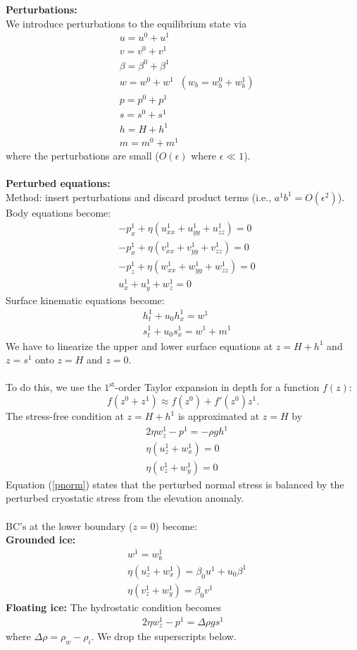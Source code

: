 \documentclass[paper=a4, fontsize=11pt]{article}
\begin{document}
\noindent\textbf{Perturbations:}\\
We introduce perturbations to the equilibrium state via
\begin{align}
&u= u^0 +  u^1 \\
&v= v^0 +  v^1 \\
&\beta = \beta^0 + \beta^1 \\
&w =  w^0 + w^1 \;\; (w_b=w_b^0 + w_b^1)\\
&p = p^0 +  p^1\\
&s =  s^0 + s^1 \\
&h = H +  h^1 \\
&m = m^0 + m^1
\end{align}
where the perturbations are small ($O(\epsilon)$ where $\epsilon \ll 1$). \\ \\
\noindent\textbf{Perturbed equations:}\\
Method: insert perturbations and discard product terms (i.e., $a^1b^1=O(\epsilon^2)$).\\
Body equations become:
\begin{align}
&-p_x^1 + \eta (u_{xx}^1 +u_{yy}^1+ u_{zz}^1) = 0 \\
&-p_x^1 + \eta (v_{xx}^1 +v_{yy}^1+ v_{zz}^1) = 0 \\
&-p_z^1 + \eta (w_{xx}^1 +w_{yy}^1+ w_{zz}^1) = 0\\
&u_x^1 + u_y^1 + w_z^1 = 0
\end{align}
Surface kinematic equations become:
\begin{align}
&h_t^1 + u_0 h_x^1  = w^1 \label{ht} \\
&s_t^1  + u_0 s_x^1 = w^1 + m^1 \label{st}
\end{align}
We have to linearize the upper and lower surface equations at $z=H +  h^1$
and $z= s^1$ onto $z=H$ and $z=0$.
\\ \\
To do this, we
use the $1^\mathrm{st}$-order Taylor expansion in depth for a function $f(z)$:
$$ f(z^0 + z^1) \approx f(z^0) + f'(z^0)z^1. $$
The stress-free condition at $z=H+h^1$ is approximated at $z=H$ by
\begin{align}
&2\eta w_z^1 - p^1 = -\rho g h^1 \label{pnorm} \\
&\eta(u_z^1 +w_x^1) = 0 \\
&\eta(v_z^1 +w_y^1) = 0
\end{align}
Equation (\ref{pnorm}) states that the perturbed normal stress is balanced
by the perturbed cryostatic stress from the elevation anomaly.
\\ \\
BC's at the lower boundary ($z=0$) become:\\
\textbf{Grounded ice:}
\begin{align}
&w^1  = w_b^1\\
&\eta(u_z^1 + w_x^1) = \beta_0 u^1 + u_0\beta^1 \\
&\eta(v_z^1 +w_y^1) = \beta_0 v^1
\end{align}
\textbf{Floating ice:}
The hydrostatic condition becomes
\begin{align}
2\eta w_z^1 - p^1 = \Delta\rho g s^1
\end{align}
where $\Delta\rho = \rho_w-\rho_i$.
We drop the superscripts below.
\end{document}
